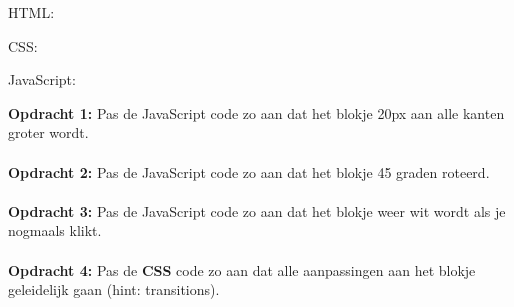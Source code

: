 \documentclass[a4paper]{report}
\begin{document}
\noindent HTML:


\noindent CSS:


\noindent JavaScript:


\noindent \textbf{Opdracht 1:} Pas de JavaScript code zo aan dat het blokje 20px aan alle kanten groter wordt.
\\
\\
\noindent \textbf{Opdracht 2:} Pas de JavaScript code zo aan dat het blokje 45 graden roteerd.
\\
\\
\noindent \textbf{Opdracht 3:} Pas de JavaScript code zo aan dat het blokje weer wit wordt als je nogmaals klikt.
\\
\\
\noindent \textbf{Opdracht 4:} Pas de \textbf{CSS} code zo aan dat alle aanpassingen aan het blokje geleidelijk gaan (hint: transitions).
\end{document}
